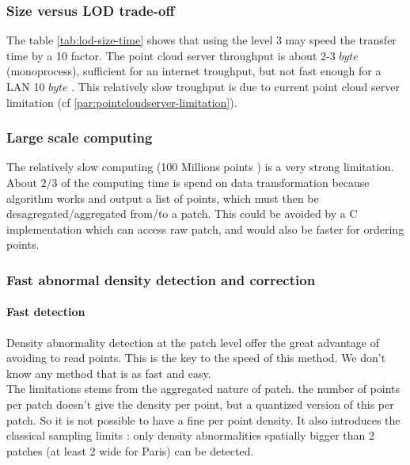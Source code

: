 		 \subsubsection{Size versus LOD trade-off}
		 \label{point-cloud-server-troughput}
			 The table \ref{tab:lod-size-time} shows that using the level 3 may speed the transfer time by a 10 factor.
			 The point cloud server throughput is about 2-3 \mega $byte$ \per \second  (monoprocess),  sufficient for an internet troughput, but not fast enough for a LAN 10 \mega $byte$ \per \second.
			 This relatively slow troughput is due to current point cloud server limitation (cf \ref{par:pointcloudserver-limitation}).
		 \subsubsection{Large scale computing}
			 
			 The relatively slow computing (100 Millions points \per \second ) is a very strong limitation.
			 About $2/3$ of the computing time is spend on data transformation because algorithm works and output a list of points, which must then be desagregated/aggregated from/to a patch.
			 This could be avoided by a C implementation which can access raw patch, and would also be faster for ordering points.
			    
		 \subsubsection{Fast abnormal density detection and correction}
			 \paragraph{Fast detection}
				 Density abnormality detection at the patch level offer the great advantage of avoiding to read points. This is the key to the speed of this method. We don't know any method that is as fast and easy.
				 \\
				 The limitations stems from the aggregated nature of patch. the number of points per patch doesn't give the density per point, but a quantized version of this per patch.
				 So it is not possible to have a fine per point density.
				 It also introduces the classical sampling limits : only density abnormalities spatially bigger than 2 patches (at least 2 \meter \space wide for Paris) can be detected.
				 
